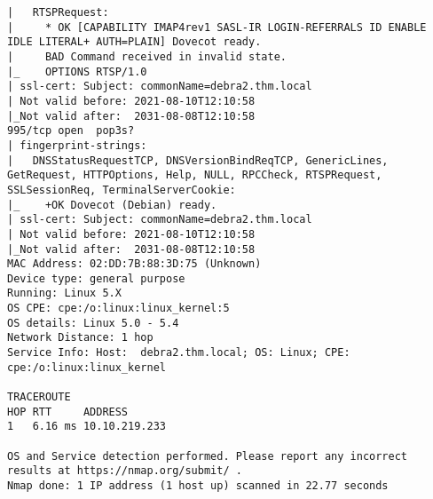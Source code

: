 \documentclass[11pt]{article}  %
\newenvironment{commandbox}[1][]{
    \begin{tcolorbox}[
        colback=kalibackground,   
        colframe=commandcolor,    
        fonttitle=\bfseries\color{white},  
        title=#1,               
        breakable=true           
    ]
}{
    \end{tcolorbox}
}
\begin{document}
\begin{commandbox}[Aggressive Scan]
\begin{lstlisting}[basicstyle=\normalsize\ttfamily\color{kalitext}]
|   RTSPRequest: 
|     * OK [CAPABILITY IMAP4rev1 SASL-IR LOGIN-REFERRALS ID ENABLE IDLE LITERAL+ AUTH=PLAIN] Dovecot ready.
|     BAD Command received in invalid state.
|_    OPTIONS RTSP/1.0
| ssl-cert: Subject: commonName=debra2.thm.local
| Not valid before: 2021-08-10T12:10:58
|_Not valid after:  2031-08-08T12:10:58
995/tcp open  pop3s?
| fingerprint-strings: 
|   DNSStatusRequestTCP, DNSVersionBindReqTCP, GenericLines, GetRequest, HTTPOptions, Help, NULL, RPCCheck, RTSPRequest, SSLSessionReq, TerminalServerCookie: 
|_    +OK Dovecot (Debian) ready.
| ssl-cert: Subject: commonName=debra2.thm.local
| Not valid before: 2021-08-10T12:10:58
|_Not valid after:  2031-08-08T12:10:58
MAC Address: 02:DD:7B:88:3D:75 (Unknown)
Device type: general purpose
Running: Linux 5.X
OS CPE: cpe:/o:linux:linux_kernel:5
OS details: Linux 5.0 - 5.4
Network Distance: 1 hop
Service Info: Host:  debra2.thm.local; OS: Linux; CPE: cpe:/o:linux:linux_kernel

TRACEROUTE
HOP RTT     ADDRESS
1   6.16 ms 10.10.219.233

OS and Service detection performed. Please report any incorrect results at https://nmap.org/submit/ .
Nmap done: 1 IP address (1 host up) scanned in 22.77 seconds
\end{lstlisting}
\end{commandbox}
\end{document}
